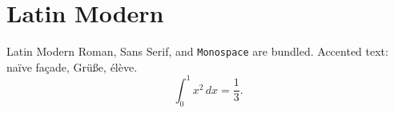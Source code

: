 \documentclass{article}
\begin{document}
\section*{Latin Modern}
Latin Modern Roman, \textsf{Sans Serif}, and \texttt{Monospace} are bundled.
Accented text: naïve façade, Grüße, élève.
\[
  \int_0^1 x^2\,dx = \frac{1}{3}.
\]
\end{document}
